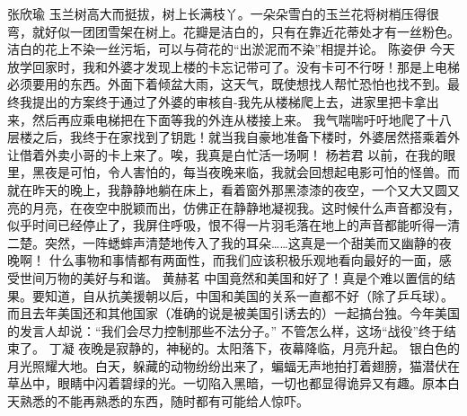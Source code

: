 {}张欣瑜\markdownRendererInterblockSeparator
{}玉兰树高大而挺拔，树上长满枝丫。一朵朵雪白的玉兰花将树梢压得很弯，就好似一团团雪架在树上。花瓣是洁白的，只有在靠近花蒂处才有一丝粉色。洁白的花上不染一丝污垢，可以与荷花的“出淤泥而不染”相提并论。 \markdownRendererInterblockSeparator
{}\markdownRendererInterblockSeparator
{}陈姿伊\markdownRendererInterblockSeparator
{}今天放学回家时，我和外婆才发现上楼的卡忘记带可了。没有卡可不行呀！那是上电梯必须要用的东西。外面下着倾盆大雨，这天气，既使想找人帮忙恐怕也找不到。最终我提出的方案终于通过了外婆的审核自-我先从楼梯爬上去，进家里把卡拿出来，然后再应乘电梯把在下面等我的外连从楼接上来。\markdownRendererInterblockSeparator
{}我气喘喘吁吁地爬了十八层楼之后，我终于在家找到了钥匙！就当我自豪地准备下楼时，外婆居然搭乘着外让借着外卖小哥的卡上来了。唉，我真是白忙活一场啊！\markdownRendererInterblockSeparator
{}\markdownRendererInterblockSeparator
{}杨若君\markdownRendererInterblockSeparator
{}以前，在我的眼里，黑夜是可怕，令人害怕的，每当夜晚来临，我就会回想起电影可怕的怪兽。而就在昨天的晚上，我静静地躺在床上，看着窗外那黑漆漆的夜空，一个又大又圆又亮的月亮，在夜空中脱颖而出，仿佛正在静静地凝视我。这时候什么声音都没有，似乎时间已经停止了，我屏住呼吸，恨不得一片羽毛落在地上的声音都能听得一清二楚。突然，一阵蟋蟀声清楚地传入了我的耳朵……这真是一个甜美而又幽静的夜晚啊！\markdownRendererInterblockSeparator
{}什么事物和事情都有两面性，而我们应该积极乐观地看向最好的一面，感受世间万物的美好与和谐。\markdownRendererInterblockSeparator
{}\markdownRendererInterblockSeparator
{}黄赫茗\markdownRendererInterblockSeparator
{}中国竟然和美国和好了！真是个难以置信的结果。要知道，自从抗美援朝以后，中国和美国的关系一直都不好（除了乒乓球）。而且去年美国还和其他国家（准确的说是被美国引诱去的）一起搞台独。今年美国的发言人却说：“我们会尽力控制那些不法分子。”\markdownRendererInterblockSeparator
{}不管怎么样，这场“战役”终于结束了。\markdownRendererInterblockSeparator
{}\markdownRendererInterblockSeparator
{}丁凝\markdownRendererInterblockSeparator
{}夜晚是寂静的，神秘的。太阳落下，夜幕降临，月亮升起。\markdownRendererInterblockSeparator
{}银白色的月光照耀大地。白天，躲藏的动物纷纷出来了，蝙蝠无声地拍打着翅膀，猫潜伏在草丛中，眼睛中闪着碧绿的光。一切陷入黑暗，一切也都显得诡异又有趣。原本白天熟悉的不能再熟悉的东西，随时都有可能给人惊吓。\markdownRendererInterblockSeparator
{}\markdownRendererInterblockSeparator
